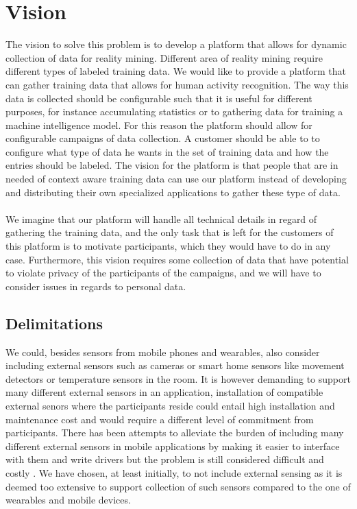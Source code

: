 \section{Vision}
\label{sec:vision}
The vision to solve this problem is to develop a platform that allows for dynamic collection of data for reality mining. Different area of reality mining require different types of labeled training data. We would like to provide a platform that can gather training data that allows for human activity recognition. The way this data is collected should be configurable such that it is useful for different purposes, for instance accumulating statistics or to gathering data for training a machine intelligence model. For this reason the platform should allow for configurable campaigns of data collection. A customer should be able to to configure what type of data he wants in the set of training data and how the entries should be labeled. The vision for the platform is that people that are in needed of context aware training data can use our platform instead of developing and distributing their own specialized applications to gather these type of data. 
\\\\
We imagine that our platform will handle all technical details in regard of gathering the training data, and the only task that is left for the customers of this platform is to motivate participants, which they would have to do in any case. Furthermore, this vision requires some collection of data that have potential to violate privacy of the participants of the campaigns, and we will have to consider issues in regards to personal data.

\subsection{Delimitations}
\label{sub:delimitations}
We could, besides sensors from mobile phones and wearables, also consider including external sensors such as cameras or smart home sensors like movement detectors or temperature sensors in the room. It is however demanding to support many different external sensors in an application, installation of compatible external senors where the participants reside could entail high installation and maintenance cost and would require a different level of commitment from participants. There has been attempts to alleviate the burden of including many different external sensors in mobile applications by making it easier to interface with them and write drivers but the problem is still considered difficult and costly \parencite{open_data_kit}. We have chosen, at least initially, to not include external sensing as it is deemed too extensive to support collection of such sensors compared to the one of wearables and mobile devices.